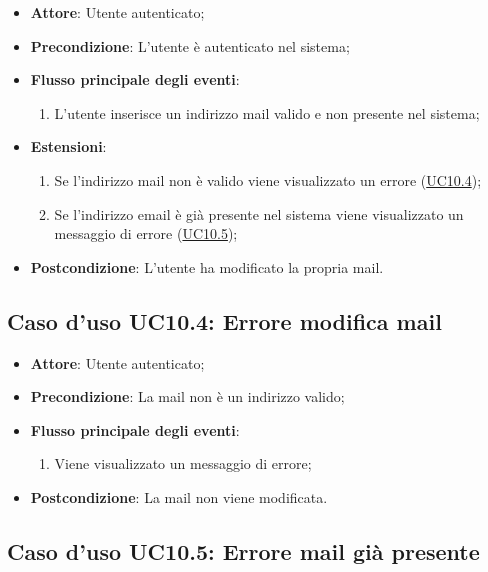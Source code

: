 \documentclass[12pt,a4paper]{article}
\begin{document}
\begin{itemize}

\item \textbf{Attore}: Utente autenticato; 
\item \textbf{Precondizione}: L'utente è autenticato nel sistema;

\item \textbf{Flusso principale degli eventi}:
\begin{enumerate}
	\item L'utente inserisce un indirizzo mail valido e non presente nel sistema;
	
\end{enumerate}
\item \textbf{Estensioni}:
\begin{enumerate}
	\item Se l'indirizzo mail non è valido viene visualizzato un errore (\hyperlink{UC10.4}{UC10.4});
	\item Se l'indirizzo email è già presente nel sistema viene visualizzato un messaggio di errore (\hyperlink{UC10.5}{UC10.5});
	
\end{enumerate}
\item \textbf{Postcondizione}: L'utente ha modificato la propria mail.
\end{itemize}
\hypertarget{UC10.4}{}
\subsection{Caso d'uso UC10.4: Errore modifica mail}

\begin{itemize}

\item \textbf{Attore}: Utente autenticato; 
\item \textbf{Precondizione}: La mail non è un indirizzo valido;

\item \textbf{Flusso principale degli eventi}:
\begin{enumerate}
	\item Viene visualizzato un messaggio di errore;
	
\end{enumerate}
\item \textbf{Postcondizione}: La mail non viene modificata.
\end{itemize}
\hypertarget{UC10.5}{}
\subsection{Caso d'uso UC10.5: Errore mail già presente}
\end{document}
